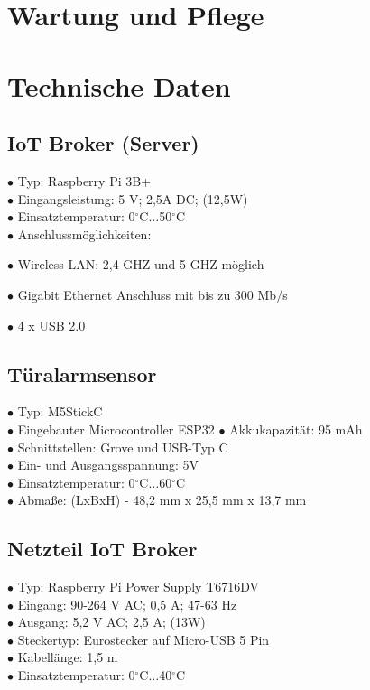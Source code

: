 \documentclass[12pt,a4paper,openany]{scrbook}
\begin{document}
	
	\section{Wartung und Pflege}
	
	
	\section{Technische Daten}
	\subsection{IoT Broker (Server)}
	$\bullet$ Typ: Raspberry Pi 3B+\\ 
	$\bullet$ Eingangsleistung: 5 V; 2,5A DC; (12,5W) \\
	$\bullet$ Einsatztemperatur: 0$^\circ$C$\dots$50$^\circ$C \\ 
	$\bullet$ Anschlussmöglichkeiten: \par
	$\bullet$ Wireless LAN: 2,4 GHZ und 5 GHZ möglich\par 
	$\bullet$ Gigabit Ethernet Anschluss mit bis zu 300 Mb/s \par
	$\bullet$ 4 x USB 2.0 
	
	
	\subsection{Türalarmsensor}
	
	$\bullet$ Typ: M5StickC\\ 
	$\bullet$ Eingebauter Microcontroller ESP32
	$\bullet$ Akkukapazität: 95 mAh\\ 
	$\bullet$ Schnittstellen: Grove und USB-Typ C\\ 
	$\bullet$ Ein- und Ausgangsspannung: 5V\\ 
	$\bullet$ Einsatztemperatur: 0$^\circ$C$\dots$60$^\circ$C\\ 
	$\bullet$ Abmaße: (LxBxH) - 48,2 mm x 25,5 mm x 13,7 mm
	
	
	\subsection{Netzteil IoT Broker}
		$\bullet$ Typ: Raspberry Pi Power Supply T6716DV\\ 
	$\bullet$ Eingang: 90-264 V AC; 0,5 A; 47-63 Hz \\
	$\bullet$ Ausgang: 5,2 V AC; 2,5 A; (13W)\\ 
	$\bullet$ Steckertyp: Eurostecker auf Micro-USB 5 Pin \\ 
	$\bullet$ Kabellänge: 1,5 m\\ 
	$\bullet$ Einsatztemperatur:
	0$^\circ$C$\dots$40$^\circ$C \\ 
	
\end{document}
